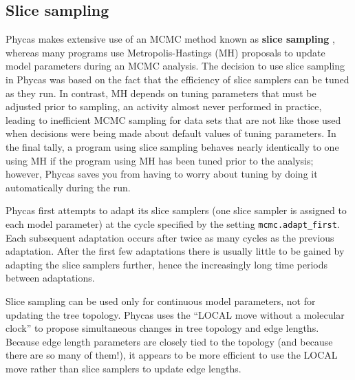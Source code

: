 \documentclass[10pt]{article}
\newcommand{\opt}[2]{{\tt \small #1.#2}\index{#1!#2}}	%
\newcommand{\term}[1]{{\bfseries #1}\index{#1}}	%
\begin{document}
\subsection{Slice sampling}
Phycas makes extensive use of an MCMC method known as \term{slice sampling} \citep{Neal2003a}, whereas many programs use Metropolis-Hastings (MH) proposals to update model parameters during an MCMC analysis. The decision to use slice sampling in Phycas was based on the fact that the efficiency of slice samplers can be tuned as they run. In contrast, MH depends on tuning parameters that must be adjusted prior to sampling, an activity almost never performed in practice, leading to inefficient MCMC sampling for data sets that are not like those used when decisions were being made about default values of tuning parameters. In the final tally, a program using slice sampling behaves nearly identically to one using MH if the program using MH has been tuned prior to the analysis; however, Phycas saves you from having to worry about tuning by doing it automatically during the run. 

Phycas first attempts to adapt its slice samplers (one slice sampler is assigned to each model parameter) at the cycle specified by the setting \opt{mcmc}{adapt\_first}. Each subsequent adaptation occurs after twice as many cycles as the previous adaptation. After the first few adaptations there is usually little to be gained by adapting the slice samplers further, hence the increasingly long time periods between adaptations. 

Slice sampling can be used only for continuous model parameters, not for updating the tree topology. Phycas uses the \citet{LargetSimon1999} ``LOCAL move without a molecular clock'' to propose simultaneous changes in tree topology and edge lengths. Because edge length parameters are closely tied to the topology (and because there are so many of them!), it appears to be more efficient to use the LOCAL move rather than slice samplers to update edge lengths.

\end{document}
